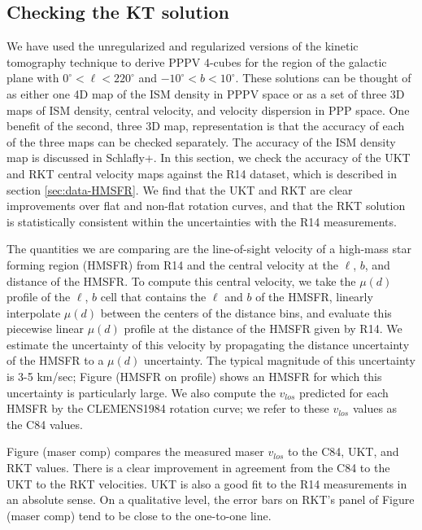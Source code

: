 \subsection{Checking the KT solution}
\label{sec:KT-validation}

We have used the unregularized and regularized versions of the kinetic tomography technique to derive PPPV 4-cubes for the region of the galactic plane with $0^\circ < \ell < 220^\circ$ and $-10^\circ < b < 10^\circ$. %
These solutions can be thought of as either one 4D map of the ISM density in PPPV space or as a set of three 3D maps of ISM density, central velocity, and velocity dispersion in PPP space. One benefit of the second, three 3D map, representation is that the accuracy of each of the three maps can be checked separately. The accuracy of the ISM density map is discussed in Schlafly+. In this section, we check the accuracy of the UKT and RKT central velocity maps against the R14 dataset, which is described in section \ref{sec:data-HMSFR}. We find that the UKT and RKT are clear improvements over flat and non-flat rotation curves, and that the RKT solution is statistically consistent within the uncertainties with the R14 measurements. 

The quantities we are comparing are the line-of-sight velocity of a high-mass star forming region (HMSFR) from R14 and the central velocity at the $\ell$, $b$, and distance of the HMSFR. To compute this central velocity, we take the $\mu(d)$ profile of the $\ell$, $b$ cell that contains the $\ell$ and $b$ of the HMSFR, linearly interpolate $\mu(d)$ between the centers of the distance bins, and evaluate this piecewise linear $\mu(d)$ profile at the distance of the HMSFR given by R14. We estimate the uncertainty of this velocity by propagating the distance uncertainty of the HMSFR to a $\mu(d)$ uncertainty. The typical magnitude of this uncertainty is 3-5 km/sec; Figure (HMSFR on profile) shows an HMSFR for which this uncertainty is particularly large. We also compute the $v_{los}$ predicted for each HMSFR by the CLEMENS1984 rotation curve; we refer to these $v_{los}$ values as the C84 values. 

Figure (maser comp) compares the measured maser $v_{los}$ to the C84, UKT, and  RKT values. There is a clear improvement in agreement from the C84 to the UKT to the RKT velocities. UKT is also a good fit to the R14 measurements in an absolute sense. On a qualitative level, the error bars on RKT's panel of Figure (maser comp) tend to be close to the one-to-one line. 

